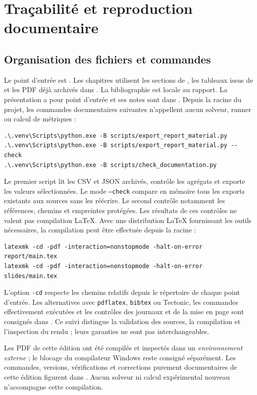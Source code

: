 \chapter{Traçabilité et reproduction documentaire}
\label{app:reproduction}
\section{Organisation des fichiers et commandes}
Le point d'entrée est . Les chapitres utilisent
les sections de , les tableaux issus de
 et les PDF déjà archivés dans
. La bibliographie est locale au
rapport. La présentation a pour point d'entrée 
et ses notes sont dans .
Depuis la racine du projet, les commandes documentaires suivantes
n'appellent aucun solveur, runner ou calcul de métriques :
\begin{lstlisting}
.\.venv\Scripts\python.exe -B scripts/export_report_material.py
.\.venv\Scripts\python.exe -B scripts/export_report_material.py --check
.\.venv\Scripts\python.exe -B scripts/check_documentation.py
\end{lstlisting}
Le premier script lit les CSV et JSON archivés, contrôle les agrégats
et exporte les valeurs sélectionnées. Le mode \texttt{--check} compare
en mémoire tous les exports existants aux sources sans les réécrire.
Le second contrôle notamment les références, chemins et empreintes
protégées. Les résultats de ces contrôles ne valent pas compilation LaTeX.
Avec une distribution LaTeX fournissant les outils nécessaires, la
compilation peut être effectuée depuis la racine :
\begin{lstlisting}
latexmk -cd -pdf -interaction=nonstopmode -halt-on-error report/main.tex
latexmk -cd -pdf -interaction=nonstopmode -halt-on-error slides/main.tex
\end{lstlisting}
L'option \texttt{-cd} respecte les chemins relatifs depuis le répertoire
de chaque point d'entrée. Les alternatives avec \texttt{pdflatex},
\texttt{bibtex} ou Tectonic, les commandes effectivement exécutées et
les contrôles des journaux et de la mise en page sont consignés dans
. Ce suivi distingue la validation des
sources, la compilation et l'inspection du rendu ; leurs garanties ne
sont pas interchangeables.

Les PDF de cette édition ont été compilés et inspectés dans un
\emph{environnement externe} ; le blocage du compilateur Windows reste
consigné séparément. Les commandes, versions, vérifications et corrections
purement documentaires de cette édition figurent dans
. Aucun solveur ni
calcul expérimental nouveau n'accompagne cette compilation.

